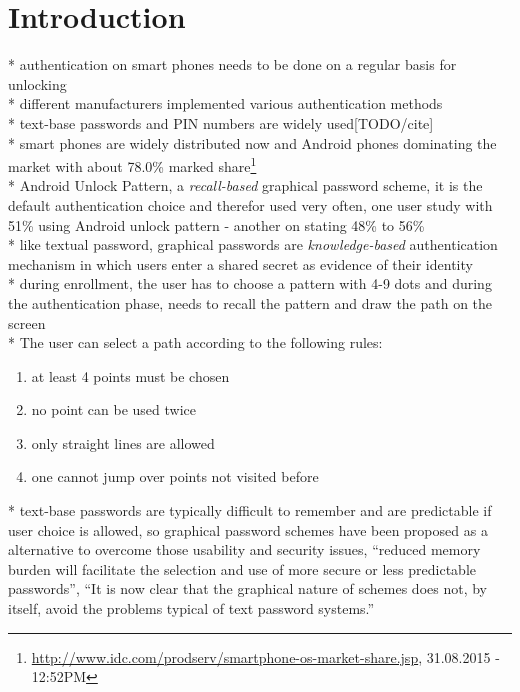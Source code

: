 \documentclass[twocolumn, a4paper, 10pt]{article}
\begin{document}
\section{Introduction}
\label{sec:intro}
* authentication on smart phones needs to be done on a regular basis for unlocking\\
* different manufacturers implemented various authentication methods\\ * text-base passwords and PIN numbers are widely used[TODO/cite]\\
* smart phones are widely distributed now and Android phones dominating the market with about 78.0\% marked share\footnote{\url{http://www.idc.com/prodserv/smartphone-os-market-share.jsp}, 31.08.2015 - 12:52PM}\\
* Android Unlock Pattern, a \textit{recall-based} graphical password scheme, it is the default authentication choice and therefor used very often, one user study with 51\% using Android unlock pattern - \cite{VanBruggen:2013:MSU:2501604.2501614} another on stating 48\% to 56\%\cite{van2014studying}\\
* like textual password, graphical passwords are \textit{knowledge-based} authentication mechanism in which users enter a shared secret as evidence of their identity\\
* during enrollment, the user has to choose a pattern with 4-9 dots and during the authentication phase, needs to recall the pattern and draw the path on the screen\\
* The user can select a path according to the following rules:
\begin{enumerate}
	\item at least 4 points must be chosen
	\item no point can be used twice
	\item only straight lines are allowed
	\item one cannot jump over points not visited before
\end{enumerate}
*  text-base passwords are typically difficult to remember and are predictable if user choice is allowed, so graphical password schemes have been proposed as a alternative to overcome those usability and security issues, ``reduced memory burden will facilitate the selection and use of more secure or less predictable passwords'', ``It is now clear that the graphical nature of schemes does not, by itself, avoid the problems typical of text password systems.''\cite{Biddle:2012:GPL:2333112.2333114}\\
\end{document}
